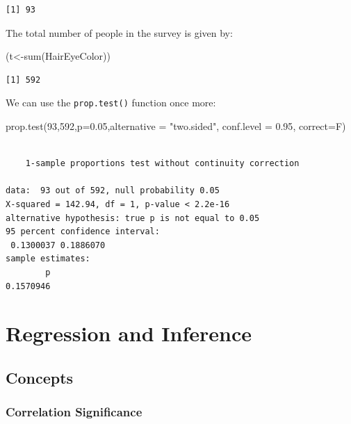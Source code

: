 \documentclass[
  letterpaper,
  DIV=11,
  numbers=noendperiod]{scrreprt}
\newenvironment{Shaded}{\begin{snugshade}}{\end{snugshade}}
\newcommand{\AttributeTok}[1]{\textcolor[rgb]{0.40,0.45,0.13}{#1}}
\newcommand{\DecValTok}[1]{\textcolor[rgb]{0.68,0.00,0.00}{#1}}
\newcommand{\FloatTok}[1]{\textcolor[rgb]{0.68,0.00,0.00}{#1}}
\newcommand{\FunctionTok}[1]{\textcolor[rgb]{0.28,0.35,0.67}{#1}}
\newcommand{\NormalTok}[1]{\textcolor[rgb]{0.00,0.23,0.31}{#1}}
\newcommand{\OtherTok}[1]{\textcolor[rgb]{0.00,0.23,0.31}{#1}}
\newcommand{\StringTok}[1]{\textcolor[rgb]{0.13,0.47,0.30}{#1}}
\begin{document}
\begin{verbatim}
[1] 93
\end{verbatim}

The total number of people in the survey is given by:

\begin{Shaded}
\begin{Highlighting}[numbers=left,,]
\NormalTok{(t}\OtherTok{\textless{}{-}}\FunctionTok{sum}\NormalTok{(HairEyeColor))}
\end{Highlighting}
\end{Shaded}

\begin{verbatim}
[1] 592
\end{verbatim}

We can use the \texttt{prop.test()} function once more:

\begin{Shaded}
\begin{Highlighting}[numbers=left,,]
\FunctionTok{prop.test}\NormalTok{(}\DecValTok{93}\NormalTok{,}\DecValTok{592}\NormalTok{,}\AttributeTok{p=}\FloatTok{0.05}\NormalTok{,}\AttributeTok{alternative =} \StringTok{"two.sided"}\NormalTok{, }\AttributeTok{conf.level =} \FloatTok{0.95}\NormalTok{, }\AttributeTok{correct=}\NormalTok{F)}
\end{Highlighting}
\end{Shaded}

\begin{verbatim}

    1-sample proportions test without continuity correction

data:  93 out of 592, null probability 0.05
X-squared = 142.94, df = 1, p-value < 2.2e-16
alternative hypothesis: true p is not equal to 0.05
95 percent confidence interval:
 0.1300037 0.1886070
sample estimates:
        p 
0.1570946 
\end{verbatim}

\hypertarget{regression-and-inference}{%
\chapter{Regression and Inference}\label{regression-and-inference}}

\hypertarget{concepts-13}{%
\section{Concepts}\label{concepts-13}}

\hypertarget{correlation-significance}{%
\subsection*{Correlation Significance}\label{correlation-significance}}
\end{document}
